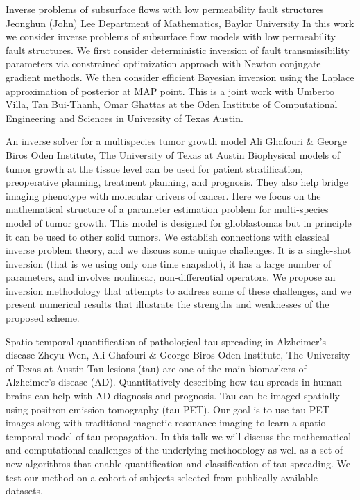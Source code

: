 \begin{addmargin}[2em]{0em}
\vspace{2ex}
\abs
{Inverse problems of subsurface flows with low permeability fault structures}
{Jeonghun (John) Lee}
{Department of Mathematics, Baylor University}
{In this work we consider inverse problems of subsurface flow models with low permeability fault structures. We first consider deterministic inversion of fault transmissibility parameters via constrained optimization approach with Newton conjugate gradient methods. We then consider efficient Bayesian inversion using the Laplace approximation of posterior at MAP point. This is a joint work with Umberto Villa, Tan Bui-Thanh, Omar Ghattas at the Oden Institute of Computational Engineering and Sciences in University of Texas Austin.}

\vspace{1.5ex}
\abs
{An inverse solver for a multispecies tumor growth model}
{Ali Ghafouri \& George Biros}
{Oden Institute, The University of Texas at Austin}
{Biophysical models of tumor growth at the tissue level can be used for patient stratification, preoperative planning, treatment planning, and prognosis. They also help bridge imaging phenotype with molecular drivers of cancer. Here we focus on the mathematical structure of a parameter estimation problem for multi-species model of tumor growth. This model is designed for glioblastomas but in principle it can be used to other solid tumors.  We establish connections with classical inverse problem theory, and we discuss some unique challenges. It is a single-shot inversion (that is we using only one time snapshot), it has a large number of parameters, and involves nonlinear, non-differential operators. We propose an inversion methodology that attempts to address some of these challenges, and we present numerical results that illustrate the strengths and weaknesses of the proposed scheme.}


\vspace{1.5ex}
\abs
{Spatio-temporal quantification of pathological tau spreading in Alzheimer's disease}
{Zheyu Wen, Ali Ghafouri \& George Biros}
{Oden Institute, The University of Texas at Austin}
{Tau lesions (tau) are one of the main biomarkers of Alzheimer's disease (AD). Quantitatively describing how tau spreads in human brains can help with AD diagnosis and prognosis. Tau can be imaged spatially using positron emission tomography (tau-PET). Our goal is to use tau-PET images along with traditional magnetic resonance imaging to learn a spatio-temporal model of tau propagation. In this talk we will discuss the mathematical and computational challenges of the underlying methodology as well as a set of new algorithms that enable quantification and classification of tau spreading. We test our method on a cohort of subjects selected from publically available datasets.}



\end{addmargin}
